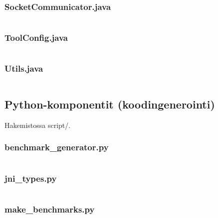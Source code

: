 \documentclass[a4paper,11pt]{article}
\begin{document}
\subsubsection{SocketCommunicator.java}
\inputminted[fontsize=\footnotesize, linenos, numbersep=5pt, tabsize=4, frame=topline,framesep=0.8cm]{java}{/home/tituomin/StudioProjects/nativebenchmark/src/fi/helsinki/cs/tituomin/nativebenchmark/SocketCommunicator.java}
\vspace{1cm}
\subsubsection{ToolConfig.java}
\inputminted[fontsize=\footnotesize, linenos, numbersep=5pt, tabsize=4, frame=topline,framesep=0.8cm]{java}{/home/tituomin/StudioProjects/nativebenchmark/src/fi/helsinki/cs/tituomin/nativebenchmark/ToolConfig.java}
\vspace{1cm}
\subsubsection{Utils.java}
\inputminted[fontsize=\footnotesize, linenos, numbersep=5pt, tabsize=4, frame=topline,framesep=0.8cm]{java}{/home/tituomin/StudioProjects/nativebenchmark/src/fi/helsinki/cs/tituomin/nativebenchmark/Utils.java}
\newpage
\subsection{Python-komponentit (koodingenerointi)}
Hakemistossa script/.
\vspace{1cm}
\subsubsection{benchmark\_generator.py}
\inputminted[fontsize=\footnotesize, linenos, numbersep=5pt, tabsize=4, frame=topline,framesep=0.8cm]{python}{/home/tituomin/StudioProjects/nativebenchmark/script/benchmark_generator.py}
\vspace{1cm}
\subsubsection{jni\_types.py}
\inputminted[fontsize=\footnotesize, linenos, numbersep=5pt, tabsize=4, frame=topline,framesep=0.8cm]{python}{/home/tituomin/StudioProjects/nativebenchmark/script/jni_types.py}
\vspace{1cm}
\subsubsection{make\_benchmarks.py}
\inputminted[fontsize=\footnotesize, linenos, numbersep=5pt, tabsize=4, frame=topline,framesep=0.8cm]{python}{/home/tituomin/StudioProjects/nativebenchmark/script/make_benchmarks.py}
\vspace{1cm}
\end{document}
